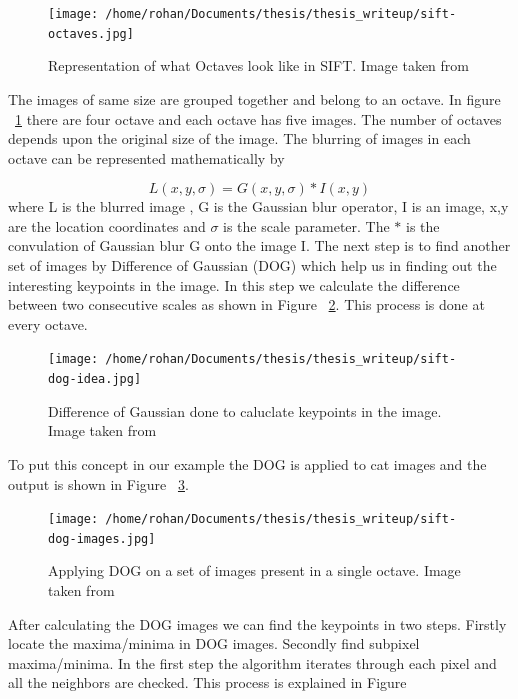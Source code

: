 \documentclass[12pt]{dalcsthesis}
\begin{document}
\begin{figure}
  \centering
     {\texttt{[image: /home/rohan/Documents/thesis/thesis\_writeup/sift-octaves.jpg]}}
  \caption{\label{fig- sift octaves} Representation of what Octaves look like in SIFT. Image taken from \cite{sift_url}}
\end{figure}

The images of same size are grouped together and belong to an octave. In figure ~\ref{fig- sift octaves} there are four octave and each octave has five images. The number of octaves depends upon the original size of the image. The blurring of images in each octave can be represented mathematically by 

\begin{equation}
L(x,y,\sigma) = G(x,y,\sigma) * I(x,y)
\end{equation}
where L is the blurred image , G is the Gaussian blur operator, I is an image, x,y are the location coordinates and $\sigma$ is the scale parameter. The $*$ is the convulation of Gaussian blur G onto the image I. 
The next step is to find another set of images by Difference of Gaussian (DOG) which help us in finding out the interesting keypoints in the image. In this step we calculate the difference between two consecutive scales as shown in Figure ~\ref{fig- sift dog}. This process is done at every octave. 

\begin{figure}
  \centering
     {\texttt{[image: /home/rohan/Documents/thesis/thesis\_writeup/sift-dog-idea.jpg]}}
  \caption{\label{fig- sift dog} Difference of Gaussian done to caluclate keypoints in the image. Image taken from \cite{sift_url}}
\end{figure}

To put this concept in our example the DOG is applied to cat images and the output is shown in Figure ~\ref{fig- sift dog images}. 
\begin{figure}
  \centering
     {\texttt{[image: /home/rohan/Documents/thesis/thesis\_writeup/sift-dog-images.jpg]}}
  \caption{\label{fig- sift dog images} Applying DOG on a set of images present in a single octave. Image taken from \cite{sift_url}}
\end{figure}

After calculating the DOG images we can find the keypoints in two steps. Firstly locate the maxima/minima in DOG images. Secondly find subpixel maxima/minima. In the first step the algorithm iterates through each pixel and all the neighbors are checked. This process is explained in Figure 
\end{document}
